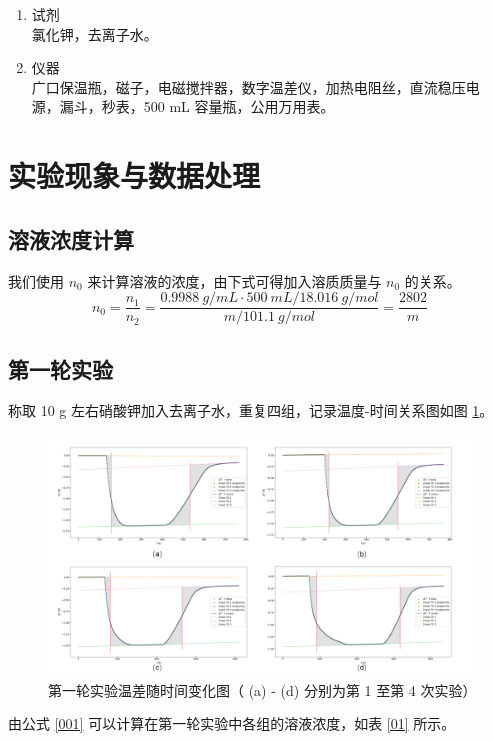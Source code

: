 \documentclass[cn,hazy,pku,12pt,normal,math=newtx,cite=super]{elegantnote}
\begin{document}
\begin{enumerate} %
    \item 试剂 \\   氯化钾，去离子水。
    \item 仪器 \\   广口保温瓶，磁子，电磁搅拌器，数字温差仪，加热电阻丝，直流稳压电
    源，漏斗，秒表，500 mL 容量瓶，公用万用表。
\end{enumerate}

\section{实验现象与数据处理}
\subsection{溶液浓度计算}
我们使用 $n_0$ 来计算溶液的浓度，由下式可得加入溶质质量与 $n_0$ 的关系。
\begin{equation}\label{001}
    n_0 = \frac{n_1}{n_2} = \frac{0.9988\ g/mL \cdot 500\ mL / 18.016\ g/mol}{m/101.1\ g/mol} = \frac{2802}{m}
\end{equation}
\subsection{第一轮实验}
称取 10 g 左右硝酸钾加入去离子水，重复四组，记录温度-时间关系图如图 \ref{2}。

\begin{figure}[htbp]
    \centering
    \includegraphics[width = \textwidth]{image/r1.png}
    \caption{第一轮实验温差随时间变化图（ (a) - (d) 分别为第 1 至第 4 次实验）}\label{2}
\end{figure}

由公式 \ref{001} 可以计算在第一轮实验中各组的溶液浓度，如表 \ref{01} 所示。
\end{document}
